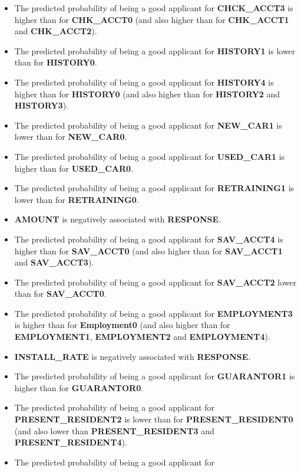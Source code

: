 \documentclass[
]{article}
\providecommand{\tightlist}{%
  \setlength{\itemsep}{0pt}\setlength{\parskip}{0pt}}
\begin{document}
\begin{itemize}
\tightlist
\item
  The predicted probability of being a good applicant for
  \textbf{CHCK\_ACCT3} is higher than for \textbf{CHK\_ACCT0} (and also
  higher than for \textbf{CHK\_ACCT1} and \textbf{CHK\_ACCT2}).
\item
  The predicted probability of being a good applicant for
  \textbf{HISTORY1} is lower than for \textbf{HISTORY0}.
\item
  The predicted probability of being a good applicant for
  \textbf{HISTORY4} is higher than for \textbf{HISTORY0} (and also
  higher than for \textbf{HISTORY2} and \textbf{HISTORY3}).
\item
  The predicted probability of being a good applicant for
  \textbf{NEW\_CAR1} is lower than for \textbf{NEW\_CAR0}.
\item
  The predicted probability of being a good applicant for
  \textbf{USED\_CAR1} is higher than for \textbf{USED\_CAR0}.
\item
  The predicted probability of being a good applicant for
  \textbf{RETRAINING1} is lower than for \textbf{RETRAINING0}.
\item
  \textbf{AMOUNT} is negatively associated with \textbf{RESPONSE}.
\item
  The predicted probability of being a good applicant for
  \textbf{SAV\_ACCT4} is higher than for \textbf{SAV\_ACCT0} (and also
  higher than for \textbf{SAV\_ACCT1} and \textbf{SAV\_ACCT3}).
\item
  The predicted probability of being a good applicant for
  \textbf{SAV\_ACCT2} lower than for \textbf{SAV\_ACCT0}.
\item
  The predicted probability of being a good applicant for
  \textbf{EMPLOYMENT3} is higher than for \textbf{Employment0} (and also
  higher than for \textbf{EMPLOYMENT1}, \textbf{EMPLOYMENT2} and
  \textbf{EMPLOYMENT4}).
\item
  \textbf{INSTALL\_RATE} is negatively associated with
  \textbf{RESPONSE}.
\item
  The predicted probability of being a good applicant for
  \textbf{GUARANTOR1 } is higher than for \textbf{GUARANTOR0}.
\item
  The predicted probability of being a good applicant for
  \textbf{PRESENT\_RESIDENT2} is lower than for
  \textbf{PRESENT\_RESIDENT0} (and also lower than
  \textbf{PRESENT\_RESIDENT3} and \textbf{PRESENT\_RESIDENT4}).
\item
  The predicted probability of being a good applicant for

\end{itemize}
\end{document}
